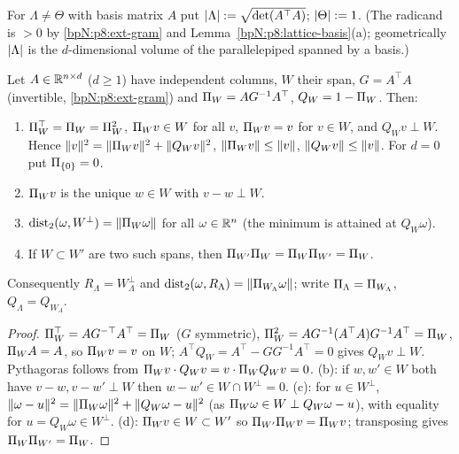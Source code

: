 \begin{definition}\label{bpN:p8:volume-def}
For $\Lambda\ne\Theta$ with basis matrix $A$ put $\lvert \Lambda\rvert:=\sqrt{\det(A^\top A)}$; $\lvert \Theta\rvert:=1$. (The radicand is $>0$ by \ref{bpN:p8:ext-gram} and Lemma~\ref{bpN:p8:lattice-basis}(a); geometrically $\lvert \Lambda\rvert$ is the $d$-dimensional volume of the parallelepiped spanned by a basis.)
\end{definition}

\begin{lemma}\label{bpN:p8:projection}
Let $A\in\mathbb{R}^{n\times d}$ ($d\ge1$) have independent columns, $W$ their span, $G=A^\top A$ (invertible, \ref{bpN:p8:ext-gram}) and $\Pi_W=AG^{-1}A^\top$, $Q_W=1-\Pi_W$. Then:
\begin{enumerate}[label=(\alph*)]
\item $\Pi_W^\top=\Pi_W=\Pi_W^2$, $\Pi_Wv\in W$ for all $v$, $\Pi_Wv=v$ for $v\in W$, and $Q_Wv\perp W$. Hence $\lVert v\rVert^2=\lVert \Pi_Wv\rVert^2+\lVert Q_Wv\rVert^2$, $\lVert \Pi_Wv\rVert\le\lVert v\rVert$, $\lVert Q_Wv\rVert\le\lVert v\rVert$. For $d=0$ put $\Pi_{\{0\}}=0$.
\item $\Pi_Wv$ is the unique $w\in W$ with $v-w\perp W$.
\item $\operatorname{dist}_2(\omega,W^\perp)=\lVert \Pi_W\omega\rVert$ for all $\omega\in\mathbb{R}^n$ (the minimum is attained at $Q_W\omega$).
\item If $W\subset W'$ are two such spans, then $\Pi_{W'}\Pi_W=\Pi_W\Pi_{W'}=\Pi_W$.
\end{enumerate}
Consequently $R_\Lambda=W_\Lambda^\perp$ and $\operatorname{dist}_2(\omega,R_\Lambda)=\lVert \Pi_{W_\Lambda}\omega\rVert$; write $\Pi_\Lambda=\Pi_{W_\Lambda}$, $Q_\Lambda=Q_{W_\Lambda}$.
\end{lemma}
\begin{proof}
\label{stepN:p8:pr-alg} $\Pi_W^\top=A G^{-\top}A^\top=\Pi_W$ ($G$ symmetric), $\Pi_W^2=AG^{-1}(A^\top A)G^{-1}A^\top=\Pi_W$, $\Pi_WA=A$, so $\Pi_Wv=v$ on $W$; $A^\top Q_W=A^\top-GG^{-1}A^\top=0$ gives $Q_Wv\perp W$. Pythagoras follows from $\Pi_Wv\cdot Q_Wv=v\cdot\Pi_WQ_Wv=0$.
\label{stepN:p8:pr-dist} (b): if $w,w'\in W$ both have $v-w,v-w'\perp W$ then $w-w'\in W\cap W^\perp=0$. (c): for $u\in W^\perp$, $\lVert \omega-u\rVert^2=\lVert \Pi_W\omega\rVert^2+\lVert Q_W\omega-u\rVert^2$ (as $\Pi_W\omega\in W\perp Q_W\omega-u$), with equality for $u=Q_W\omega\in W^\perp$.
\label{stepN:p8:pr-nest} (d): $\Pi_W v\in W\subset W'$ so $\Pi_{W'}\Pi_Wv=\Pi_Wv$; transposing gives $\Pi_W\Pi_{W'}=\Pi_W$.
\end{proof}

